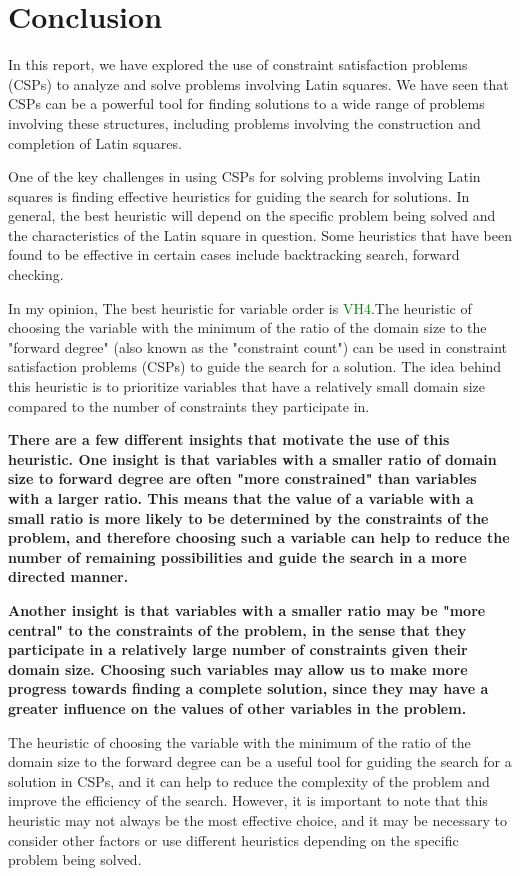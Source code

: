 \documentclass[14pt]{scrartcl} %
\begin{document}
\section{Conclusion}

In this report, we have explored the use of constraint satisfaction problems (CSPs) to analyze and solve problems involving Latin squares. We have seen that CSPs can be a powerful tool for finding solutions to a wide range of problems involving these structures, including problems involving the construction and completion of Latin squares.

One of the key challenges in using CSPs for solving problems involving Latin squares is finding effective heuristics for guiding the search for solutions. In general, the best heuristic will depend on the specific problem being solved and the characteristics of the Latin square in question. Some heuristics that have been found to be effective in certain cases include backtracking search, forward checking.

In my opinion, The best heuristic for variable order is \textcolor{green}{VH4}.The heuristic of choosing the variable with the minimum of the ratio of the domain size to the "forward degree" (also known as the "constraint count") can be used in constraint satisfaction problems (CSPs) to guide the search for a solution. The idea behind this heuristic is to prioritize variables that have a relatively small domain size compared to the number of constraints they participate in.

\textbf{There are a few different insights that motivate the use of this heuristic. One insight is that variables with a smaller ratio of domain size to forward degree are often "more constrained" than variables with a larger ratio. This means that the value of a variable with a small ratio is more likely to be determined by the constraints of the problem, and therefore choosing such a variable can help to reduce the number of remaining possibilities and guide the search in a more directed manner.}

\textbf{Another insight is that variables with a smaller ratio may be "more central" to the constraints of the problem, in the sense that they participate in a relatively large number of constraints given their domain size. Choosing such variables may allow us to make more progress towards finding a complete solution, since they may have a greater influence on the values of other variables in the problem.}

The heuristic of choosing the variable with the minimum of the ratio of the domain size to the forward degree can be a useful tool for guiding the search for a solution in CSPs, and it can help to reduce the complexity of the problem and improve the efficiency of the search. However, it is important to note that this heuristic may not always be the most effective choice, and it may be necessary to consider other factors or use different heuristics depending on the specific problem being solved.
\end{document}
